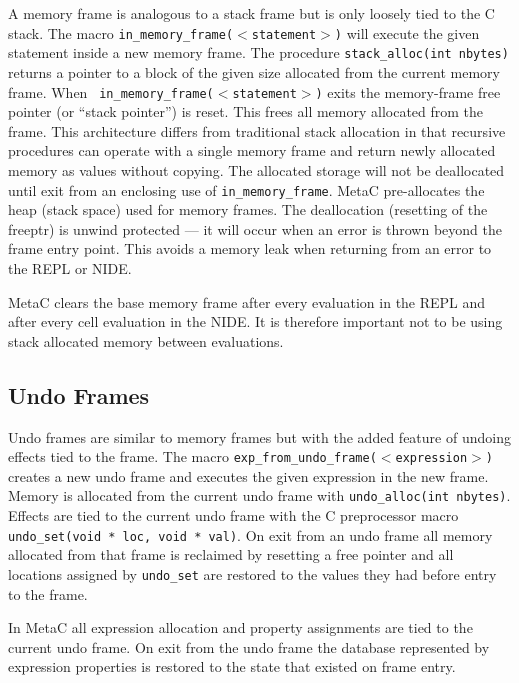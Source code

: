 \documentclass{article}
\begin{document}
A memory frame is analogous to a stack frame but is only loosely tied
to the C stack.  The macro {\tt in\_memory\_frame($<$statement$>$)}
will execute the given statement inside a new memory frame.  The
procedure {\tt stack\_alloc(int nbytes)} returns a pointer to a block
of the given size allocated from the current memory frame. When {\tt
  in\_memory\_frame($<$statement$>$)} exits the memory-frame free
pointer (or ``stack pointer'') is reset.  This frees all memory
allocated from the frame.  This architecture differs from traditional
stack allocation in that recursive procedures can operate with a
single memory frame and return newly allocated memory as values
without copying.  The allocated storage will not be deallocated until
exit from an enclosing use of {\tt in\_memory\_frame}.  MetaC
pre-allocates the heap (stack space) used for memory frames.  The
deallocation (resetting of the freeptr) is unwind protected --- it
will occur when an error is thrown beyond the frame entry point.  This
avoids a memory leak when returning from an error to the REPL or
NIDE.

MetaC clears the base memory frame after every evaluation in the REPL and after every cell evaluation in the NIDE.
It is therefore important not to be using
stack allocated memory between evaluations.

\subsection{Undo Frames}
\label{sec:undo}
Undo frames are similar to memory frames but with the added feature of undoing effects tied to the frame.
The macro {\tt exp\_from\_undo\_frame($<$expression$>$)} creates a new undo frame and executes the given expression
in the new frame. Memory is allocated from the current undo frame
with {\tt undo\_alloc(int nbytes)}.  Effects are tied to the current undo frame with the C preprocessor macro
{\tt undo\_set(void * loc, void * val)}.  On exit from an undo frame all memory allocated from that frame is reclaimed by resetting a free pointer
and all locations assigned by {\tt undo\_set} are restored to the values they had before entry to the frame.

In MetaC all expression allocation and property assignments are tied to the current undo frame.
On exit from the undo frame the database represented by expression properties is restored to
the state that existed on frame entry.
\end{document}
